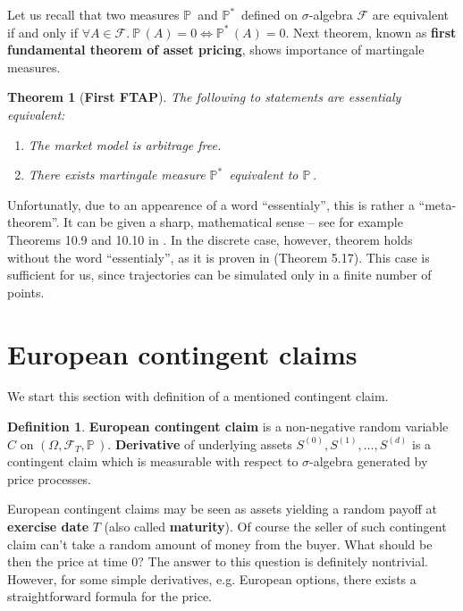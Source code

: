 \documentclass[a4paper,12pt, oneside]{book}
\newtheorem{thm}{Theorem}[section]
\theoremstyle{definition}
\newtheorem{mydef}{Definition}[section]
\theoremstyle{remark}
\def\P{{\mathbb{P}}\,}
\def\Pm{{\mathbb{P}}^*\,}
\begin{document}
Let us recall that two measures $\P$ and $\Pm$ defined on $\sigma$-algebra $\mathcal{F}$ are equivalent if and only if $\forall A \in \mathcal{F}.\ \P(A)=0 \Leftrightarrow \Pm(A)=0$. Next theorem, known as \textbf{first fundamental theorem of asset pricing}, shows importance of martingale measures.
\begin{thm}[\bfseries First FTAP]
 \label{thm:fftap}
 The following to statements are \emph{essentialy} equivalent:
 \begin{enumerate}
  \item The market model is arbitrage free.
  \item There exists martingale measure $\Pm$ equivalent to $\P$.
 \end{enumerate}
\end{thm}
Unfortunatly, due to an appearence of a word ``essentialy'', this is rather a ``meta-theorem''. It can be given a sharp, mathematical sense -- see for example Theorems 10.9 and 10.10 in \cite{bjork}. In the discrete case, however, theorem holds without the word ``essentialy'', as it is proven in \cite{follmer} (Theorem 5.17). This case is sufficient for us, since trajectories can be simulated only in a finite number of points.

\section{European contingent claims}
We start this section with definition of a mentioned contingent claim.
\begin{mydef}
 \label{def:cc_eu}
 \textbf{European contingent claim} is a non-negative random variable $C$ on $(\Omega, \mathcal{F}_T, \P)$. \textbf{Derivative} of underlying assets $S^{(0)}, S^{(1)}, \ldots, S^{(d)}$ is a contingent claim which is measurable with respect to $\sigma$-algebra generated by price processes.
\end{mydef}
European contingent claims may be seen as assets yielding a random payoff at \textbf{exercise date} $T$ (also called \textbf{maturity}). Of course the seller of such contingent claim can't take a random amount of money from the buyer. What should be then the price at time $0$? The answer to this question is definitely nontrivial. However, for some simple derivatives, e.g. European options, there exists a straightforward formula for the price.
\end{document}
